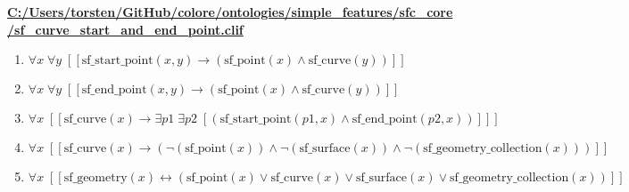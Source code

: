 \documentclass{article}
\begin{document}
\textbf{\url{C:/Users/torsten/GitHub/colore/ontologies/simple\_features/sfc\_core/sf\_curve\_start\_and\_end\_point.clif}}

\begin{enumerate}
\item $\forall x\; \forall y\;  \left[ \left[ \textrm{sf\_start\_point}(x,y) \rightarrow \left(\textrm{sf\_point}(x) \land \textrm{sf\_curve}(y)\right) \right] \right]$
\item $\forall x\; \forall y\;  \left[ \left[ \textrm{sf\_end\_point}(x,y) \rightarrow \left(\textrm{sf\_point}(x) \land \textrm{sf\_curve}(y)\right) \right] \right]$
\item $\forall x\;  \left[ \left[ \textrm{sf\_curve}(x) \rightarrow \exists p1\; \exists p2\;  \left[ \left(\textrm{sf\_start\_point}(p1,x) \land \textrm{sf\_end\_point}(p2,x)\right) \right] \right] \right]$
\item $\forall x\;  \left[ \left[ \textrm{sf\_curve}(x) \rightarrow \left(\neg \left(\textrm{sf\_point}(x)\right) \land \neg \left(\textrm{sf\_surface}(x)\right) \land \neg \left(\textrm{sf\_geometry\_collection}(x)\right)\right) \right] \right]$
\item $\forall x\;  \left[ \left[ \textrm{sf\_geometry}(x) \leftrightarrow \left(\textrm{sf\_point}(x) \lor \textrm{sf\_curve}(x) \lor \textrm{sf\_surface}(x) \lor \textrm{sf\_geometry\_collection}(x)\right) \right] \right]$
\end{enumerate}
\end{document}

